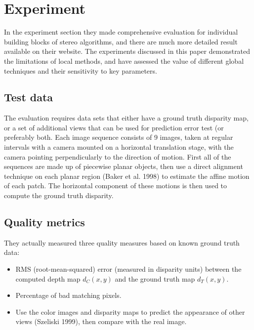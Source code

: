 \documentclass[10pt,twocolumn,letterpaper]{article}
\begin{document}
\section{Experiment}
In the experiment section they made comprehensive evaluation 
for individual building blocks of stereo algorithms, and there are
much more detailed result available on their website. 
The experiments discussed in this paper demonstrated 
the limitations of local methods, and have assessed the value of different global
techniques and their sensitivity to key parameters.
\subsection{Test data}
The evaluation requires data sets that either have a
ground truth disparity map, or a set of additional 
views that can be used for prediction error test (or
preferably both. Each image sequence consists of 9 images, 
taken at regular intervals
with a camera mounted on a horizontal 
translation stage, with the camera pointing perpendicularly
to the direction of motion. First all of the sequences 
are made up of piecewise planar objects, 
then use a direct alignment technique on each
planar region (Baker et al. 1998) to estimate 
the affine motion of each patch. The horizontal
component of these motions is then 
used to compute the ground truth disparity.

\subsection{Quality metrics}
They actually measured three quality measures based
on known ground truth data:
\begin{itemize}
\item RMS (root-mean-squared) error (measured in disparity units) between the computed depth
map ${d}_{C}(x, y)$ and the ground truth map ${d}_{T}(x, y)$.
\item Percentage of bad matching pixels.
\item Use the color images and disparity maps 
to predict the appearance of other views (Szeliski 1999), 
then compare with the real image.
\end{itemize}
\end{document}
